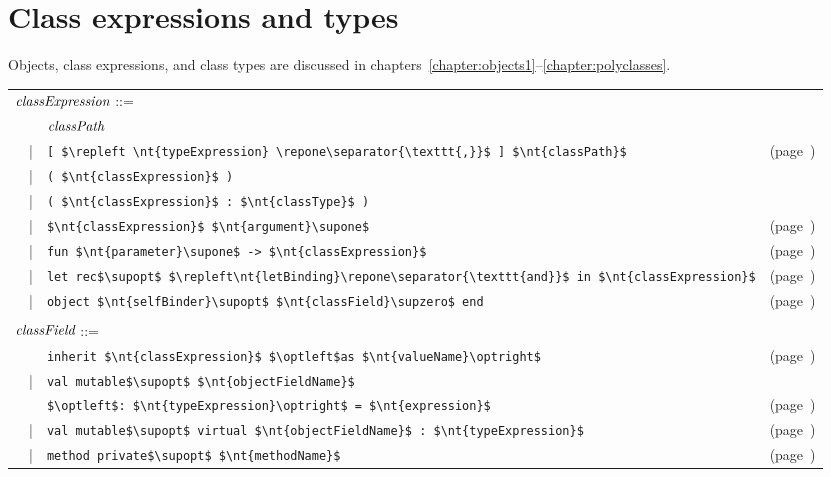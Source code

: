 \newpage
\section{Class expressions and types}

Objects, class expressions, and class types are discussed in
chapters~\ref{chapter:objects1}--\ref{chapter:polyclasses}.

\begin{center}
\begin{tabular}{rcll}
\multicolumn{3}{l}{$\textit{\rmfamily classExpression}$ ::=}\\
&   & $\textit{\rmfamily classPath}$\\
& | & \hbox{\lstinline/[ $\repleft \nt{typeExpression} \repone\separator{\texttt{,}}$ ] $\nt{classPath}$/} & (page~\pageref{classes:polymorphic})\\
& | & \hbox{\lstinline/( $\nt{classExpression}$ )/}\\
& | & \hbox{\lstinline/( $\nt{classExpression}$ : $\nt{classType}$ )/}\\
& | & \hbox{\lstinline/$\nt{classExpression}$ $\nt{argument}\supone$/} & (page~\pageref{classes:parameterized})\\
& | & \hbox{\lstinline/fun $\nt{parameter}\supone$ -> $\nt{classExpression}$/} & (page~\pageref{classes:parameterized})\\
& | & \hbox{\lstinline/let rec$\supopt$ $\repleft\nt{letBinding}\repone\separator{\texttt{and}}$ in $\nt{classExpression}$/} & (page~\pageref{classes:let})\\
& | & \hbox{\lstinline/object $\nt{selfBinder}\supopt$ $\nt{classField}\supzero$ end/} & (page~\pageref{keyword:object})\\
\\
\multicolumn{3}{l}{$\textit{\rmfamily classField}$ ::=}\\
&   & \hbox{\lstinline/inherit $\nt{classExpression}$ $\optleft$as $\nt{valueName}\optright$/} & (page~\pageref{keyword:inherit})\\
& | & \hbox{\lstinline/val mutable$\supopt$ $\nt{objectFieldName}$/}\\
&   & \hbox{\lstinline/$\optleft$: $\nt{typeExpression}\optright$ = $\nt{expression}$/} & (page~\pageref{keyword:val(objects)})\\
& | & \hbox{\lstinline/val mutable$\supopt$ virtual $\nt{objectFieldName}$ : $\nt{typeExpression}$/} & (page~\pageref{keyword:virtual})\\
& | & \hbox{\lstinline/method private$\supopt$ $\nt{methodName}$/} & (page~\pageref{keyword:private})\\

\end{tabular}
\end{center}

